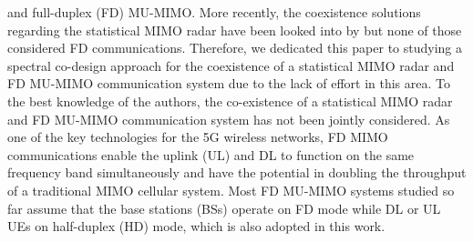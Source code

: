 \documentclass[9pt,journal]{IEEEtran}
\begin{document}
and full-duplex (FD) MU-MIMO\cite{biswas2018fdqos,singh2018transceiver}. More recently, the coexistence solutions regarding the statistical MIMO radar have been looked into by \cite{Liu2018Gloabalsip,he2019performance} %
but none of those considered FD communications. Therefore, we dedicated this paper to studying a spectral co-design approach for the coexistence of a statistical MIMO radar and FD MU-MIMO communication system due to the lack of effort in this area. To the best knowledge of the authors, the co-existence of a statistical MIMO radar and FD MU-MIMO communication system has not been jointly considered. 
As one of the key technologies for the 5G wireless networks, FD MIMO communications enable the uplink (UL) and DL to function on the same frequency band simultaneously and have the potential in doubling the throughput of a traditional MIMO cellular system\cite{FD_WMMSE}. Most FD MU-MIMO systems studied so far assume that the base stations (BSs) operate on FD mode while DL or UL UEs on half-duplex (HD) mode\cite{biswas2018fdqos,singh2018transceiver,FD_WMMSE}, which is also adopted in this work.    

	
\end{document}
